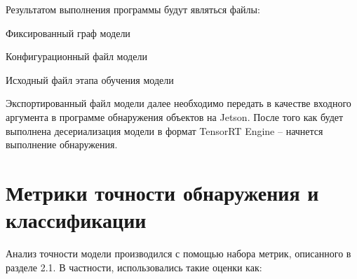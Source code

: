 
Результатом выполнения программы будут являться файлы:

%
\begin{itemize*}
  \item Фиксированный граф модели
  \item Конфигурационный файл модели
  \item Исходный файл этапа обучения модели
\end{itemize*}
%

Экспортированный файл модели далее необходимо передать в качестве входного аргумента в программе обнаружения объектов на Jetson. После того как будет выполнена десериализация модели в формат TensorRT Engine – начнется выполнение обнаружения. 

\section{Метрики точности обнаружения и классификации}

Анализ точности модели производился с помощью набора метрик, описанного в разделе 2.1. В частности, использовались такие оценки как:

